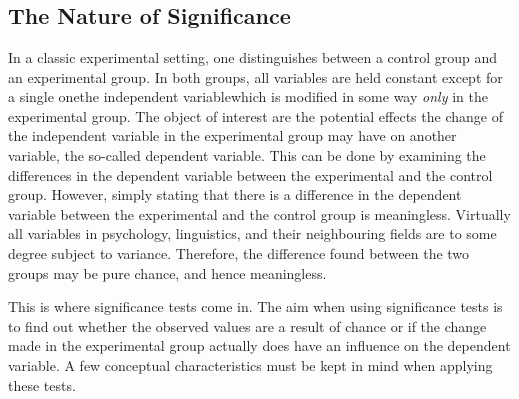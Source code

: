 \chapter{\significance}
\label{ch:sig}

\section{The Nature of Significance}
\label{sec:signat}
In a classic experimental setting, one distinguishes between a control group and an experimental group.
In both groups, all variables are held constant except for a single one\dash the independent variable\dash which is modified in some way \emph{only} in the experimental group.
The object of interest are the potential effects the change of the independent variable in the experimental group may have on another variable, the so-called dependent variable.
This can be done by examining the differences in the dependent variable between the experimental and the control group.
However, simply stating that there is a difference in the dependent variable between the experimental and the control group is meaningless.
Virtually all variables in psychology, linguistics, and their neighbouring fields are to some degree subject to variance.
Therefore, the difference found between the two groups may be pure chance, and hence meaningless.

This is where significance tests come in.
The aim when using significance tests is to find out whether the observed values are a result of chance or if the change made in the experimental group actually does have an influence on the dependent variable.
A few conceptual characteristics must be kept in mind when applying these tests.

